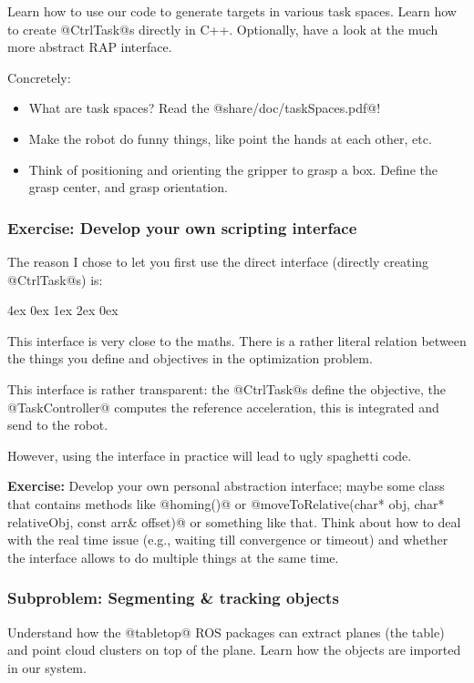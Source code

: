 \documentclass[10pt,fleqn,twoside]{article}
\newenvironment{items}[1][9]{
\par\setlength{\unitlength}{1pt}\fontsize{#1}{#1}\linespread{1.2}\selectfont
\begin{list}{--}{\leftmargin4ex \rightmargin0ex \labelsep1ex \labelwidth2ex
\topsep0pt \parsep0ex \itemsep3pt}
}{
\end{list}
}
\begin{document}
Learn how to use our code to generate targets in various task
spaces. Learn how to create @CtrlTask@s directly in C++. Optionally, have
a look at the much more abstract RAP interface.

Concretely:
\begin{itemize}
\item What are task spaces? Read the @share/doc/taskSpaces.pdf@!
\item Make the robot do funny things, like point the hands at each
  other, etc.
\item Think of positioning and orienting the gripper to grasp a
  box. Define the grasp center, and grasp orientation.
\end{itemize}

\subsubsection{Exercise: Develop your own scripting interface}

The reason I chose to let you first use the direct interface
(directly creating @CtrlTask@s) is:
\begin{items}
\item This interface is very close to the maths. There is a rather
  literal relation between the things you define and objectives in the
  optimization problem.
\item This interface is rather transparent: the @CtrlTask@s define the
  objective, the @TaskController@ computes the reference acceleration,
  this is integrated and send to the robot.
\end{items}
However, using the interface in practice will lead to ugly spaghetti
code.

\textbf{Exercise:} Develop your own personal abstraction interface;
maybe some class that contains methods like @homing()@ or
@moveToRelative(char* obj, char* relativeObj, const arr& offset)@ or
something like that. Think about how to deal with the real time issue
(e.g., waiting till convergence or timeout) and whether the interface
allows to do multiple things at the same time.



\subsubsection{Subproblem: Segmenting \& tracking objects}

Understand how the @tabletop@ ROS packages can extract planes (the
table) and point cloud clusters on top of the plane. Learn how the
objects are imported in our system.
\end{document}
